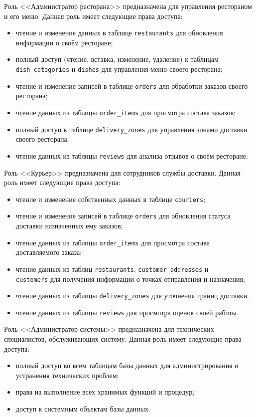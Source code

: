 Роль <<Администратор ресторана>> предназначена для управления рестораном и его меню. Данная роль имеет следующие права доступа:
\begin{itemize}
    \item чтение и изменение данных в таблице \texttt{restaurants} для обновления 
          информации о своём ресторане;
    \item полный доступ (чтение, вставка, изменение, удаление) к таблицам \texttt{dish\_categories} и \texttt{dishes} для управления меню своего ресторана;
    \item чтение и изменение записей в таблице \texttt{orders} для обработки заказов своего ресторана;
    \item чтение данных из таблицы \texttt{order\_items} для просмотра состава заказов;
    \item полный доступ к таблице \texttt{delivery\_zones} для управления зонами доставки своего ресторана.
    \item чтение данных из таблицы \texttt{reviews} для анализа отзывов о своём ресторане.
\end{itemize}

Роль <<Курьер>> предназначена для сотрудников службы доставки. Данная роль имеет следующие права доступа:
\begin{itemize}
    \item чтение и изменение собственных данных в таблице \texttt{couriers};
    \item чтение и изменение записей в таблице \texttt{orders} для обновления статуса доставки назначенных ему заказов;
    \item чтение данных из таблицы \texttt{order\_items} для просмотра состава доставляемого заказа;
    \item чтение данных из таблиц \texttt{restaurants}, \texttt{customer\_addresses} и \\\texttt{customers}  для получения информации о точках отправления и назначения;
    \item чтение данных из таблицы \texttt{delivery\_zones} для уточнения границ доставки.
    \item чтение данных из таблицы \texttt{reviews} для просмотра оценок своей работы.
\end{itemize}


Роль <<Администратор системы>> предназначена для технических специалистов, обслуживающих систему. Данная роль имеет следующие права доступа:
\begin{itemize}
    \item полный доступ ко всем таблицам базы данных для администрирования и устранения технических проблем;
    \item права на выполнение всех хранимых функций и процедур;
    \item доступ к системным объектам базы данных.
\end{itemize}

